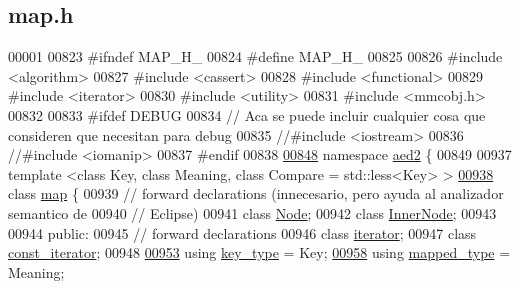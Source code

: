 \hypertarget{map_8h_source}{}\subsection{map.\+h}

\begin{DoxyCode}
00001 
00823 \textcolor{preprocessor}{#ifndef MAP\_H\_}
00824 \textcolor{preprocessor}{#define MAP\_H\_}
00825 
00826 \textcolor{preprocessor}{#include <algorithm>}
00827 \textcolor{preprocessor}{#include <cassert>}
00828 \textcolor{preprocessor}{#include <functional>}
00829 \textcolor{preprocessor}{#include <iterator>}
00830 \textcolor{preprocessor}{#include <utility>}
00831 \textcolor{preprocessor}{#include <mmcobj.h>}
00832 
00833 \textcolor{preprocessor}{#ifdef DEBUG}
00834 \textcolor{comment}{// Aca se puede incluir cualquier cosa que consideren que necesitan para debug}
00835 \textcolor{comment}{//#include <iostream>}
00836 \textcolor{comment}{//#include <iomanip>}
00837 \textcolor{preprocessor}{#endif}
00838 
\hyperlink{namespaceaed2}{00848} \textcolor{keyword}{namespace }\hyperlink{namespaceaed2}{aed2} \{
00849 
00937 \textcolor{keyword}{template} <\textcolor{keyword}{class} Key, \textcolor{keyword}{class} Meaning, \textcolor{keyword}{class} Compare = std::less<Key> >
\hyperlink{classaed2_1_1map}{00938} \textcolor{keyword}{class }\hyperlink{classaed2_1_1map}{map} \{
00939   \textcolor{comment}{// forward declarations (innecesario, pero ayuda al analizador semantico de}
00940   \textcolor{comment}{// Eclipse)}
00941   \textcolor{keyword}{class }\hyperlink{structaed2_1_1map_1_1Node}{Node};
00942   \textcolor{keyword}{class }\hyperlink{structaed2_1_1map_1_1InnerNode}{InnerNode};
00943 
00944  \textcolor{keyword}{public}:
00945   \textcolor{comment}{// forward declarations}
00946   \textcolor{keyword}{class }\hyperlink{classaed2_1_1map_1_1iterator}{iterator};
00947   \textcolor{keyword}{class }\hyperlink{classaed2_1_1map_1_1const__iterator}{const\_iterator};
00948 
\hyperlink{classaed2_1_1map_a4273e8812e7105a618df58a2c8b72b7d_a4273e8812e7105a618df58a2c8b72b7d}{00953}   \textcolor{keyword}{using} \hyperlink{classaed2_1_1map_a4273e8812e7105a618df58a2c8b72b7d_a4273e8812e7105a618df58a2c8b72b7d}{key\_type} = Key;
\hyperlink{classaed2_1_1map_aa3e34bf624f3009884a71b18f4ddae40_aa3e34bf624f3009884a71b18f4ddae40}{00958}   \textcolor{keyword}{using} \hyperlink{classaed2_1_1map_aa3e34bf624f3009884a71b18f4ddae40_aa3e34bf624f3009884a71b18f4ddae40}{mapped\_type} = Meaning;

\end{DoxyCode}
